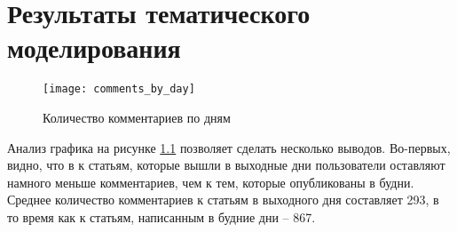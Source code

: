 \chapter{Результаты тематического моделирования} \label{app:comments_by_day}
\begin{figure}
	\centering
    \texttt{[image: comments\_by\_day]}
    \caption{Количество комментариев по дням}
    \label{fig:comments_by_day}
\end{figure}

Анализ графика на рисунке \ref{fig:comments_by_day} позволяет сделать несколько выводов. Во-первых, видно, что в к статьям, которые вышли в выходные дни пользователи оставляют намного меньше комментариев, чем к тем, которые опубликованы в будни. Среднее количество комментариев к статьям в выходного дня составляет 293, в то время как к статьям, написанным в будние дни -- 867.

